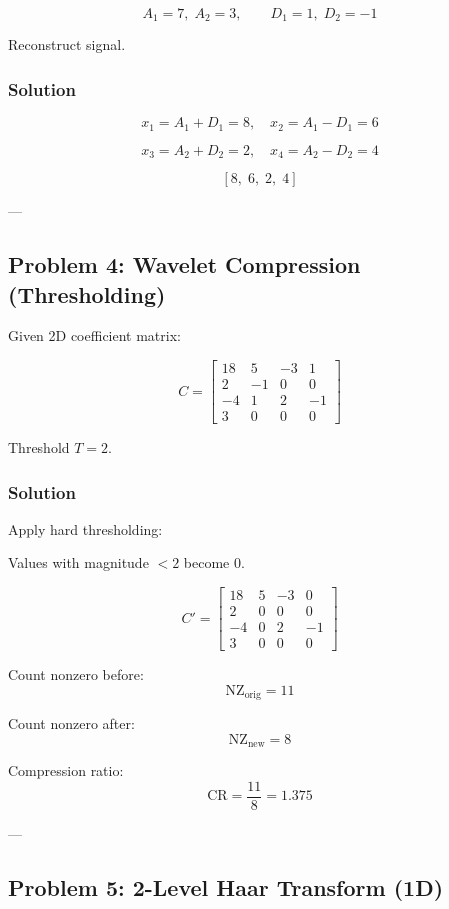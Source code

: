 \documentclass{AnantDocumentation}
\begin{document}
\[
A_1 = 7,\; A_2 = 3,\qquad
D_1 = 1,\; D_2 = -1
\]

Reconstruct signal.

\subsubsection*{Solution}

\[
x_1 = A_1 + D_1 = 8,\quad x_2 = A_1 - D_1 = 6
\]

\[
x_3 = A_2 + D_2 = 2,\quad x_4 = A_2 - D_2 = 4
\]

\[
\boxed{[8,\; 6,\; 2,\; 4]}
\]

---

\subsection*{Problem 4: Wavelet Compression (Thresholding)}

Given 2D coefficient matrix:

\[
C =
\begin{bmatrix}
18 & 5 & -3 & 1 \\
2 & -1 & 0 & 0 \\
-4 & 1 & 2 & -1 \\
3 & 0 & 0 & 0
\end{bmatrix}
\]

Threshold \(T=2\).

\subsubsection*{Solution}

Apply hard thresholding:

Values with magnitude $<2$ become 0.

\[
C' =
\begin{bmatrix}
18 & 5 & -3 & 0 \\
2 & 0 & 0 & 0 \\
-4 & 0 & 2 & -1 \\
3 & 0 & 0 & 0
\end{bmatrix}
\]

Count nonzero before:
\[
\text{NZ}_{\text{orig}} = 11
\]

Count nonzero after:
\[
\text{NZ}_{\text{new}} = 8
\]

Compression ratio:
\[
\text{CR} = \frac{11}{8} = 1.375
\]

---

\subsection*{Problem 5: 2-Level Haar Transform (1D)}
\end{document}
